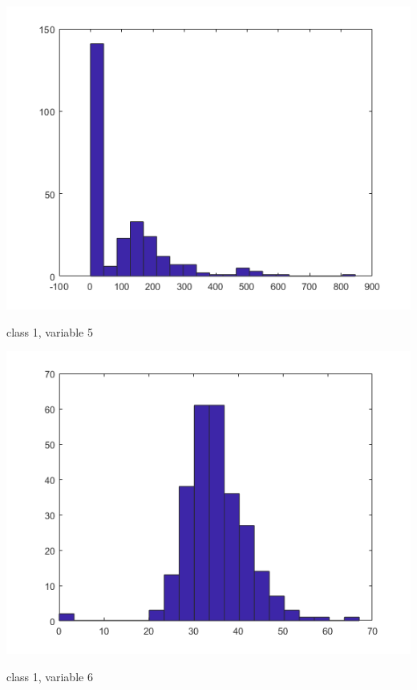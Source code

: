 \documentclass[a4paper]{article}
\begin{document}
\begin{center}
    \includegraphics[scale=1]{1-5.png}
    \caption{class 1, variable 5}
\end{center}

\begin{center}
    \includegraphics[scale=1]{1-6.png}
    \caption{class 1, variable 6}
\end{center}
\end{document}
